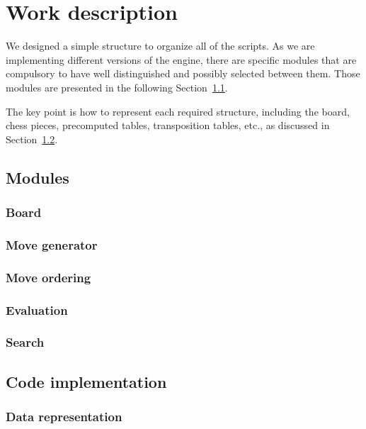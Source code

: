 \chapter{Work description}
\label{cap:descripcionTrabajo}

We designed a simple structure to organize all of the scripts. As we are implementing different versions of the engine, there are specific modules that are compulsory to have well distinguished and possibly selected between them. Those modules are presented in the following Section~\ref{sec:modules}.

\vspace{1em}

\noindent The key point is how to represent each required structure, including the board, chess pieces, precomputed tables, transposition tables, etc., as discussed in Section~\ref{sec:code}.

\section{Modules}
\label{sec:modules}

\subsection{Board}

\subsection{Move generator}

\subsection{Move ordering}

\subsection{Evaluation}

\subsection{Search}

\section{Code implementation}
\label{sec:code}

\subsection{Data representation}

